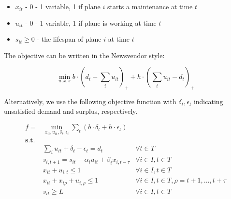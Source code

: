 \documentclass[../main]{subfiles}
\begin{document}
\begin{itemize}
  \tightlist
  \item
        \(x_{it}\) - 0 - 1 variable, 1 if plane \(i\) starts a maintenance at
        time \(t\)
  \item
        \(u_{it}\) - 0 - 1 variable, 1 if plane is working at time \(t\)
  \item
        \(s_{it} \ge 0\) - the lifespan of plane \(i\) at time \(t\)
\end{itemize}


The objective can be written in the Newsvendor style:

\begin{equation}\label{eq:fmp.newsvendor_obj}
  \min_{u,x,s} b \cdot (d_t - \sum_i u_{it})_+ + h \cdot  ( \sum_i u_{it} - d_t)_+
\end{equation}

Alternatively, we use the following objective function with
\(\delta_t, \epsilon_t\) indicating unsatisfied demand and surplus,
respectively.

\begin{align}
  \label{eq:fmp.obj}  f =    & \min_{x_{it}, u_{it}, \delta_t, \epsilon_t} \sum_t (b\cdot  \delta_t + h \cdot \epsilon_t)                                                       \\
  \nonumber \mathbf{s.t.}    &                                                                                                                                                  \\
  \label{eq:fmp.demand}      & \sum_i u_{it} + \delta_t - \epsilon_t = d_t                                                & \forall t \in T                                     \\
  \label{eq:fmp.lifespan}    & s_{i, t+1} =  s_{i t}  - \alpha_i  u_{it} + \beta_i  x_{i, t- \tau}                        & \forall i \in I, t \in T                            \\
  \label{eq:fmp.work_or_not} & x_{it} +  u_{i, t} \le 1                                                                   & \forall i \in I, t \in T                            \\
  \label{eq:fmp.leadtime}    & x_{it} + x_{i\rho} + u_{i, \rho} \le 1                                                     & \forall i \in I,  t\in T, \rho = t + 1, ..., t+\tau \\
  \label{eq:fmp.lifespan_lb} & s_{i t} \ge L                                                                              & \forall i \in I, t \in T
\end{align}
\end{document}
